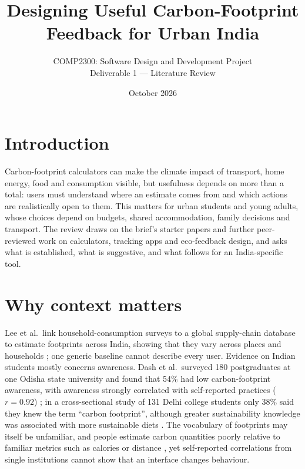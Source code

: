 \documentclass[10pt,a4paper,twocolumn]{article}
\title{\vspace{-1.25em}\Large\bfseries Designing Useful Carbon-Footprint Feedback for Urban India}
\author{\normalsize COMP2300: Software Design and Development Project\\[-1pt]
\small Deliverable 1 --- Literature Review}
\date{\small October 2026}
\begin{document}

\section{Introduction}
Carbon-footprint calculators can make the climate impact of transport, home energy, food and consumption visible, but usefulness depends on more than a total: users must understand where an estimate comes from and which actions are realistically open to them. This matters for urban students and young adults, whose choices depend on budgets, shared accommodation, family decisions and transport. The review draws on the brief's starter papers and further peer-reviewed work on calculators, tracking apps and eco-feedback design, and asks what is established, what is suggestive, and what follows for an India-specific tool.

\section{Why context matters}
Lee et al.\ link household-consumption surveys to a global supply-chain database to estimate footprints across India, showing that they vary across places and households \cite{lee2021}; one generic baseline cannot describe every user. Evidence on Indian students mostly concerns awareness. Dash et al.\ surveyed 180 postgraduates at one Odisha state university and found that 54\% had low carbon-footprint awareness, with awareness strongly correlated with self-reported practices ($r=0.92$) \cite{dash2023}; in a cross-sectional study of 131 Delhi college students only 38\% said they knew the term ``carbon footprint'', although greater sustainability knowledge was associated with more sustainable diets \cite{gandhi2025}. The vocabulary of footprints may itself be unfamiliar, and people estimate carbon quantities poorly relative to familiar metrics such as calories or distance \cite{grinstein2018}, yet self-reported correlations from single institutions cannot show that an interface changes behaviour.
\end{document}
